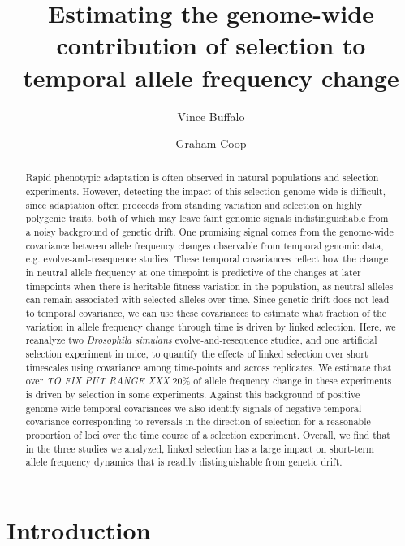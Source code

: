 \documentclass[11pt]{article}
\title{Estimating the genome-wide contribution of selection to temporal allele frequency change}
\author[$\ast$,$\dag$,$1$]{Vince Buffalo}
\author[$\dag$]{Graham Coop}
\affil[$\ast$]{\footnotesize Population Biology Graduate Group}
\affil[$\dag$]{\footnotesize Center for Population Biology, Department of Evolution and Ecology, University of California, Davis, CA 95616}
\affil[$1$]{\footnotesize Email for correspondence: \href{mailto:vsbuffalo@ucdavis.edu}{vsbuffalo@ucdavis.edu}}
\newcommand{\vb}[1]{{\it \color{blue} #1}}
\begin{document}
\maketitle

\linenumbers

\begin{abstract}

 Rapid phenotypic adaptation is often observed in natural populations and
 selection experiments.  However, detecting the impact of this selection
 genome-wide is difficult, since adaptation often proceeds from standing
 variation and selection on highly polygenic traits, both of which may leave
 faint genomic signals indistinguishable from a noisy background of genetic
 drift.  One promising signal comes from the genome-wide covariance between
 allele frequency changes observable from temporal genomic data, e.g.
 evolve-and-resequence studies. These temporal covariances reflect how the
 change in neutral allele frequency at one timepoint is predictive of the
 changes at later timepoints when there is heritable fitness variation in the
 population, as neutral alleles can remain associated with selected alleles
 over time. Since genetic drift does not lead to temporal covariance, we can
 use these covariances to estimate what fraction of the variation in allele
 frequency change through time is driven by linked selection. Here, we
 reanalyze two \emph{Drosophila simulans} evolve-and-resequence studies, and
 one artificial selection experiment in mice, to quantify the effects of linked
 selection over short timescales using covariance among time-points and across
 replicates. We estimate that over \vb{TO FIX PUT RANGE XXX} 20\% of allele
 frequency change in these experiments is driven by selection in some
 experiments. Against this background of positive genome-wide temporal
 covariances we also identify signals of negative temporal covariance
 corresponding to reversals in the direction of selection for a reasonable
 proportion of loci over the time course of a selection experiment.  Overall,
 we find that in the three studies we analyzed, linked selection has a large
 impact on short-term allele frequency dynamics that is readily distinguishable
 from genetic drift.

\end{abstract}


\section{Introduction}
\end{document}
